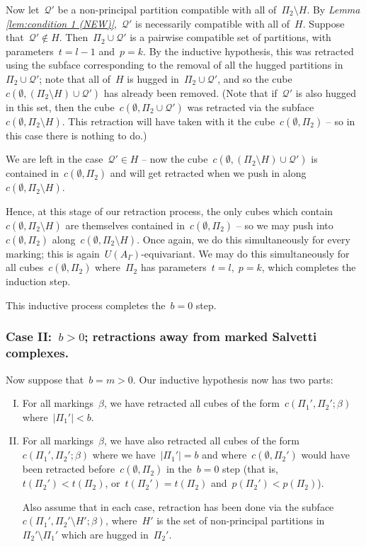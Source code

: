 \documentclass[11pt]{amsart}
\theoremstyle{definition}
\theoremstyle{definition}
\theoremstyle{definition}
\theoremstyle{definition}
\newcommand{\calQ}{\mathcal{Q}}
\newcommand{\uag}{U(A_{\Gamma})} %
\begin{document}
Now let~$\calQ'$ be a non-principal partition compatible with all of~$\Pi_2 \setminus H$. By \textit{Lemma \ref{lem:condition 1 (NEW)}},~$\calQ'$ is necessarily compatible with all of~$H$. Suppose that~$\calQ' \notin H$. Then~$\Pi_2 \cup \calQ'$ is a pairwise compatible set of partitions, with parameters~$t = l-1$ and~$p = k$. By the inductive hypothesis, this was retracted using the subface corresponding to the removal of all the hugged partitions in~$\Pi_2 \cup \calQ'$; note that all of~$H$ is hugged in~$\Pi_2 \cup \calQ'$, and so the cube~$c(\emptyset, (\Pi_2 \setminus H) \cup \calQ')$ has already been removed. (Note that if~$\calQ'$ is also hugged in this set, then the cube~$c(\emptyset, \Pi_2 \cup \calQ')$ was retracted via the subface~$c(\emptyset, \Pi_2 \setminus H)$. This retraction will have taken with it the cube~$c(\emptyset, \Pi_2)$ -- so in this case there is nothing to do.)

We are left in the case~$\calQ' \in H$ -- now the cube~$c(\emptyset, (\Pi_2 \setminus H) \cup \calQ')$ is contained in~$c(\emptyset, \Pi_2)$ and will get retracted when we push in along~$c(\emptyset, \Pi_2 \setminus H)$.

Hence, at this stage of our retraction process, the only cubes which contain~$c(\emptyset, \Pi_2 \setminus H)$ are themselves contained in~$c(\emptyset, \Pi_2)$ -- so we may push into~$c(\emptyset, \Pi_2)$ along~$c(\emptyset, \Pi_2 \setminus H)$. Once again, we do this simultaneously for every marking; this is again~$\uag$-equivariant. We may do this simultaneously for all cubes~$c(\emptyset, \Pi_2)$ where~$\Pi_2$ has parameters~$t = l,\; p = k$, which completes the induction step.

This inductive process completes the~$b = 0$ step.

\subsubsection{\textbf{Case II:}~$b > 0$; retractions away from marked Salvetti complexes. \\}\label{subsubsec: retractions away from salvettis}

Now suppose that~$b = m > 0$. Our inductive hypothesis now has two parts:

\begin{enumerate}[(I)]
    \item For all markings~$\beta$, we have retracted all cubes of the form~$c(\Pi_1', \Pi_2'; \beta)$ where~$\vert \Pi_1' \vert < b$.
    \item For all markings~$\beta$, we have also retracted all cubes of the form~$c(\Pi_1', \Pi_2'; \beta)$ where we have~$\vert \Pi_1' \vert = b$ and where~$c(\emptyset, \Pi_2')$ would have been retracted before~$c(\emptyset, \Pi_2)$ in the~$b = 0$ step (that is,~$t(\Pi_2') < t(\Pi_2)$, or~$t(\Pi_2') = t(\Pi_2)$ and~$p(\Pi_2') < p(\Pi_2)$).

     Also assume that in each case, retraction has been done via the subface~$c(\Pi_1', \Pi_2' \setminus H'; \beta)$, where~$H'$ is the set of non-principal partitions in~$\Pi_2' \setminus \Pi_1'$ which are hugged in~$\Pi_2'$.
\end{enumerate}
\end{document}
